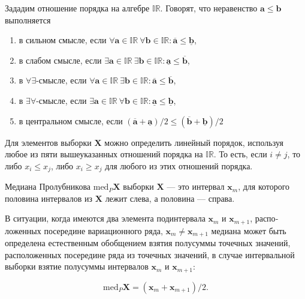 \documentclass{article}
\begin{document}
  Зададим отношение порядка на алгебре \( \mathbb{IR} \). Говорят, что
  неравенство \( \mathbf{a} \leqslant \mathbf{b} \) выполняется

  \begin{enumerate}
    \item в сильном смысле, если
      \( \forall \mathbf{a} \in \mathbb{IR} \ \forall \mathbf{b} \in \mathbb{IR}: \overline{\mathbf{a}} \leqslant \underline{\mathbf{b}} \),
    \item в слабом смысле, если
      \( \exists \mathbf{a} \in \mathbb{IR} \ \exists \mathbf{b} \in \mathbb{IR}: \underline{\mathbf{a}} \leqslant \overline{\mathbf{b}} \),
    \item в \( \forall \exists \)-смысле, если
      \( \forall \mathbf{a} \in \mathbb{IR} \ \exists \mathbf{b} \in \mathbb{IR}: \overline{\mathbf{a}} \leqslant \overline{\mathbf{b}} \),
    \item в \( \exists \forall \)-смысле, если
      \( \exists \mathbf{a} \in \mathbb{IR} \ \forall \mathbf{b} \in \mathbb{IR}: \underline{\mathbf{a}} \leqslant \underline{\mathbf{b}} \),
    \item в центральном смысле, если
      \( (\overline{\mathbf{a}} + \underline{\mathbf{a}}) / 2 \leqslant (\overline{\mathbf{b}} + \underline{\mathbf{b}}) / 2 \)
  \end{enumerate}

  Для элементов выборки \( \mathbf{X} \) можно определить линейный порядок,
  используя любое из пяти вышеуказанных отношений порядка на
  \( \mathbb{IR} \). То есть, если \( i \ne j \), то либо
  \( x_i \leqslant x_j \), либо \( x_i \geqslant x_j \) для любого из
  этих отношений порядка.

  Медиана Пролубникова \( \text{med}_P \mathbf{X} \) выборки
  \( \mathbf{X} \) --- это интервал \( \mathbf{x}_m \), для которого
  половина интервалов из \( \mathbf{X} \) лежит слева, а половина
  --- справа.

  В ситуации, когда имеются два элемента подинтервала \( \mathbf{x}_m \)
  и \( \mathbf{x}_{m+1} \), распо­ложенных посередине вариационного ряда,
  \( \mathbf{x}_m \ne \mathbf{x}_{m+1} \) медиана может быть определена
  естественным обобщением взятия полусуммы точечных значений,
  расположенных посередине ряда из точечных значений, в случае
  интервальной выборки взятие полусуммы интервалов \( \mathbf{x}_m \)
  и \( \mathbf{x}_{m+1} \):

  \begin{equation}
    \text{med}_P \mathbf{X} = (\mathbf{x}_m + \mathbf{x}_{m+1}) / 2.
  \end{equation}
\end{document}
